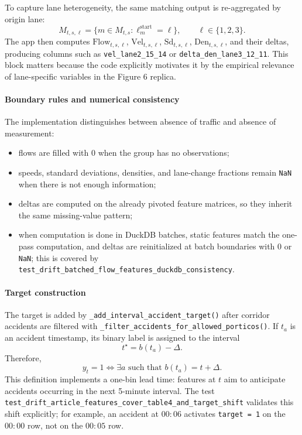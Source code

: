 To capture lane heterogeneity, the same matching output is re-aggregated by origin lane:
\[
M_{t,s,\ell} = \{m \in M_{t,s} : \ell^{\mathrm{start}}_m = \ell\},
\qquad \ell \in \{1,2,3\}.
\]
The app then computes \(\mathrm{Flow}_{t,s,\ell}\), \(\mathrm{Vel}_{t,s,\ell}\), \(\mathrm{Sd}_{t,s,\ell}\), \(\mathrm{Den}_{t,s,\ell}\), and their deltas, producing columns such as \texttt{vel\_lane2\_15\_14} or \texttt{delta\_den\_lane3\_12\_11}. This block matters because the code explicitly motivates it by the empirical relevance of lane-specific variables in the Figure 6 replica.

\paragraph{Boundary rules and numerical consistency}
The implementation distinguishes between absence of traffic and absence of measurement:
\begin{itemize}[leftmargin=*]
  \item flows are filled with \(0\) when the group has no observations;
  \item speeds, standard deviations, densities, and lane-change fractions remain \texttt{NaN} when there is not enough information;
  \item deltas are computed on the already pivoted feature matrices, so they inherit the same missing-value pattern;
  \item when computation is done in DuckDB batches, static features match the one-pass computation, and deltas are reinitialized at batch boundaries with \(0\) or \texttt{NaN}; this is covered by \texttt{test\_drift\_batched\_flow\_features\_duckdb\_consistency}.
\end{itemize}

\paragraph{Target construction}
The target is added by \texttt{\_add\_interval\_accident\_target()} after corridor accidents are filtered with \texttt{\_filter\_accidents\_for\_allowed\_porticos()}. If \(t_a\) is an accident timestamp, its binary label is assigned to the interval
\[
t^{\star} = b(t_a) - \Delta.
\]
Therefore,
\[
y_t = 1 \iff \exists a \text{ such that } b(t_a) = t + \Delta.
\]
This definition implements a one-bin lead time: features at \(t\) aim to anticipate accidents occurring in the next 5-minute interval. The test \texttt{test\_drift\_article\_features\_cover\_table4\_and\_target\_shift} validates this shift explicitly; for example, an accident at \(00{:}06\) activates \texttt{target = 1} on the \(00{:}00\) row, not on the \(00{:}05\) row.

